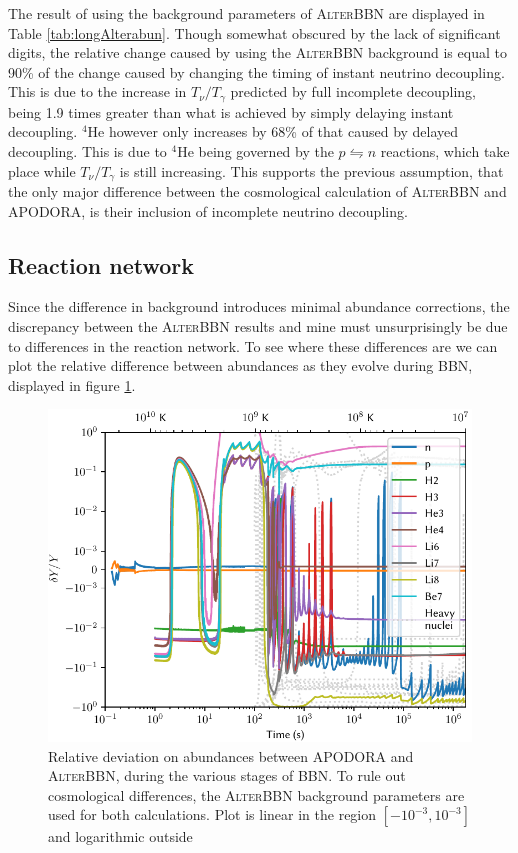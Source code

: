 The result of using the background parameters of \textsc{AlterBBN} are displayed in Table \ref{tab:longAlterabun}. Though somewhat obscured by the lack of significant digits, the relative change caused by using the \textsc{AlterBBN} background is equal to 90\% of the change caused by changing the timing of instant neutrino decoupling. This is due to the increase in $T_\nu/T_\gamma$ predicted by full incomplete decoupling, being 1.9 times greater than what is achieved by simply delaying instant decoupling. ${}^4$He however only increases by 68\% of that caused by delayed decoupling. This is due to ${}^4$He being governed by the $p\leftrightharpoons n$ reactions, which take place while $T_\nu/T_\gamma$ is still increasing. This supports the previous assumption, that the only major difference between the cosmological calculation of \textsc{AlterBBN} and APODORA, is their inclusion of incomplete neutrino decoupling.

\subsection{Reaction network}

Since the difference in background introduces minimal abundance corrections, the discrepancy between the \textsc{AlterBBN} results and mine must unsurprisingly be due to differences in the reaction network. To see where these differences are we can plot the relative difference between abundances as they evolve during BBN, displayed in figure \ref{fig:AlterBBNdeltaY}. 
\begin{figure}[ht]
    \includegraphics[width=5.1in]{figures/AlterBBNdeltaY.pdf}
    \caption{Relative deviation on abundances between APODORA and \textsc{AlterBBN}, during the various stages of BBN. To rule out cosmological differences, the \textsc{AlterBBN} background parameters are used for both calculations. Plot is linear in the region $[-10^{-3},10^{-3}]$ and logarithmic outside}
    \label{fig:AlterBBNdeltaY}
\end{figure}


